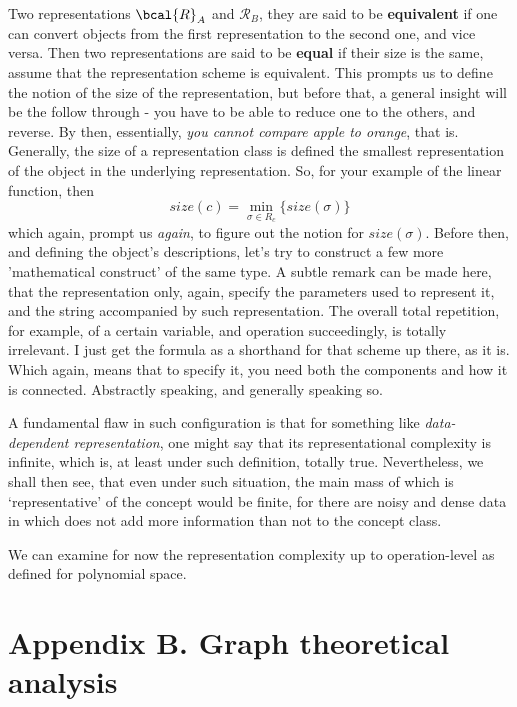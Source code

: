 Two representations $\bcal{R}_{A}$ and $\mathcal{R}_{B}$, they are said to be \textbf{equivalent} if one can convert objects from the first representation to the second one, and vice versa. Then two representations are said to be \textbf{equal} if their size is the same, assume that the representation scheme is equivalent. This prompts us to define the notion of the size of the representation, but before that, a general insight will be the follow through - you have to be able to reduce one to the others, and reverse. By then, essentially, \textit{you cannot compare apple to orange}, that is. Generally, the size of a representation class is defined the smallest representation of the object in the underlying representation. So, for your example of the linear function, then 
\begin{equation}
    size(c)=\min_{\sigma \in R_{c}}\{size(\sigma)\}
\end{equation}
which again, prompt us \textit{again}, to figure out the notion for $size(\sigma)$. Before then, and defining the object's descriptions, let's try to construct a few more 'mathematical construct' of the same type. A subtle remark can be made here, that the representation only, again, specify the parameters used to represent it, and the string accompanied by such representation. The overall total repetition, for example, of a certain variable, and operation succeedingly, is totally irrelevant. I just get the formula as a shorthand for that scheme up there, as it is. Which again, means that to specify it, you need both the components and how it is connected. Abstractly speaking, and generally speaking so. 

A fundamental flaw in such configuration is that for something like \textit{data-dependent representation}, one might say that its representational complexity is infinite, which is, at least under such definition, totally true. Nevertheless, we shall then see, that even under such situation, the main mass of which is `representative' of the concept would be finite, for there are noisy and dense data in which does not add more information than not to the concept class. 

We can examine for now the representation complexity up to operation-level as defined for polynomial space. 

\section{Appendix B. Graph theoretical analysis}

